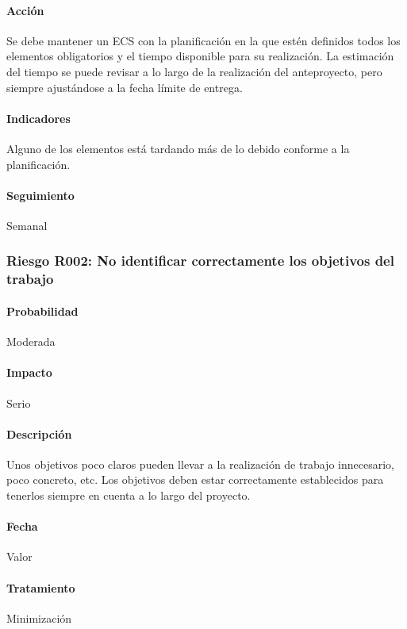 \documentclass[10pt,a4paper]{article}
\begin{document}
				\paragraph{Acción} Se debe mantener un ECS con la planificación en la que estén definidos todos los elementos obligatorios y el tiempo disponible para su realización. La estimación del tiempo se puede revisar a lo largo de la realización del anteproyecto, pero siempre ajustándose a la fecha límite de entrega. %
				\paragraph{Indicadores} Alguno de los elementos está tardando más de lo debido conforme a la planificación. %
				\paragraph{Seguimiento}	Semanal %
	
            \subsubsection{Riesgo R002: No identificar correctamente los objetivos del trabajo}
				\paragraph{Probabilidad} Moderada
				\paragraph{Impacto}	Serio
				\paragraph{Descripción} Unos objetivos poco claros pueden llevar a la realización de trabajo innecesario, poco concreto, etc. Los objetivos deben estar correctamente establecidos para tenerlos siempre en cuenta a lo largo del proyecto.
				\paragraph{Fecha} Valor %
				\paragraph{Tratamiento} Minimización %
\end{document}
